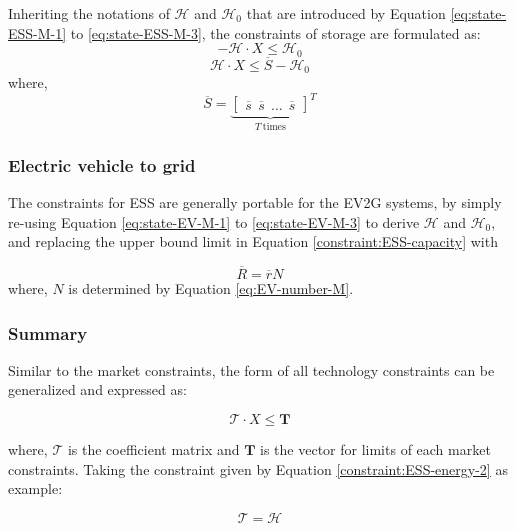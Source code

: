 Inheriting the notations of $\mathcal{H}$ and $\mathcal{H}_0$ that are introduced by Equation \eqref{eq:state-ESS-M-1} to \eqref{eq:state-ESS-M-3}, the constraints of storage are formulated as:
\begin{equation}
\label{constraint:ESS-energy-1}
-\mathcal{H} \cdot X \leq \mathcal{H}_0
\end{equation}
\begin{equation}
\label{constraint:ESS-energy-2}
\mathcal{H} \cdot X \leq \overline{S} -  \mathcal{H}_0
\end{equation}
where, 
\begin{equation*}
\overline{S} = {\underbrace{\begin{bmatrix}
		\overline{s}~~\overline{s}~~ \dots~~\overline{s}
		\end{bmatrix}}_{T~\text{times}}}^T
\end{equation*}

\subsubsection{Electric vehicle to grid}

The constraints for ESS are generally portable for the EV2G systems, by simply re-using Equation \eqref{eq:state-EV-M-1} to \eqref{eq:state-EV-M-3} to derive $\mathcal{H}$ and $\mathcal{H}_0$, and replacing the upper bound limit in Equation \eqref{constraint:ESS-capacity} with

\begin{equation}
\overline{R} = \overline{r}N
\end{equation}
where, $N$ is determined by Equation \eqref{eq:EV-number-M}. 

\subsubsection{Summary}

Similar to the market constraints, the form of all technology constraints can be generalized and expressed as:

\begin{equation}
\mathcal{T} \cdot X \leq \mathbf{T}
\end{equation}

where, $\mathcal{T}$ is the coefficient matrix and $\mathbf{T}$ is the vector for limits of each market constraints. Taking the constraint given by Equation \eqref{constraint:ESS-energy-2} as example:

\begin{equation*}
\mathcal{T} = \mathcal{H}
\end{equation*}

